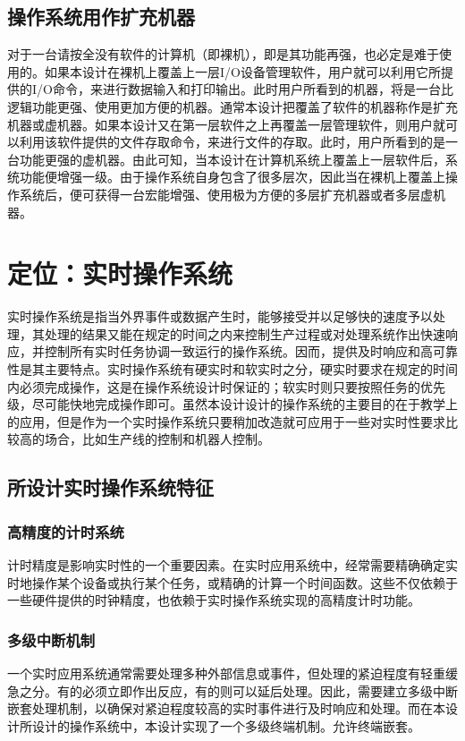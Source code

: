 \documentclass[UTF8,nofonts,cs4size]{ctexrep}
\begin{document}
\subsection{操作系统用作扩充机器}
对于一台请按全没有软件的计算机（即裸机），即是其功能再强，也必定是难于使用的。如果本设计在裸机上覆盖上一层I/O设备管理软件，用户就可以利用它所提供的I/O命令，来进行数据输入和打印输出。此时用户所看到的机器，将是一台比逻辑功能更强、使用更加方便的机器。通常本设计把覆盖了软件的机器称作是扩充机器或虚机器。如果本设计又在第一层软件之上再覆盖一层管理软件，则用户就可以利用该软件提供的文件存取命令，来进行文件的存取。此时，用户所看到的是一台功能更强的虚机器。由此可知，当本设计在计算机系统上覆盖上一层软件后，系统功能便增强一级。由于操作系统自身包含了很多层次，因此当在裸机上覆盖上操作系统后，便可获得一台宏能增强、使用极为方便的多层扩充机器或者多层虚机器。
\section{定位：实时操作系统}
实时操作系统是指当外界事件或数据产生时，能够接受并以足够快的速度予以处理，其处理的结果又能在规定的时间之内来控制生产过程或对处理系统作出快速响应，并控制所有实时任务协调一致运行的操作系统。因而，提供及时响应和高可靠性是其主要特点。实时操作系统有硬实时和软实时之分，硬实时要求在规定的时间内必须完成操作，这是在操作系统设计时保证的；软实时则只要按照任务的优先级，尽可能快地完成操作即可。虽然本设计设计的操作系统的主要目的在于教学上的应用，但是作为一个实时操作系统只要稍加改造就可应用于一些对实时性要求比较高的场合，比如生产线的控制和机器人控制。
\subsection{所设计实时操作系统特征}
\subsubsection{高精度的计时系统}
计时精度是影响实时性的一个重要因素。在实时应用系统中，经常需要精确确定实时地操作某个设备或执行某个任务，或精确的计算一个时间函数。这些不仅依赖于一些硬件提供的时钟精度，也依赖于实时操作系统实现的高精度计时功能。
\subsubsection{多级中断机制}
一个实时应用系统通常需要处理多种外部信息或事件，但处理的紧迫程度有轻重缓急之分。有的必须立即作出反应，有的则可以延后处理。因此，需要建立多级中断嵌套处理机制，以确保对紧迫程度较高的实时事件进行及时响应和处理。而在本设计所设计的操作系统中，本设计实现了一个多级终端机制。允许终端嵌套。
\end{document}
